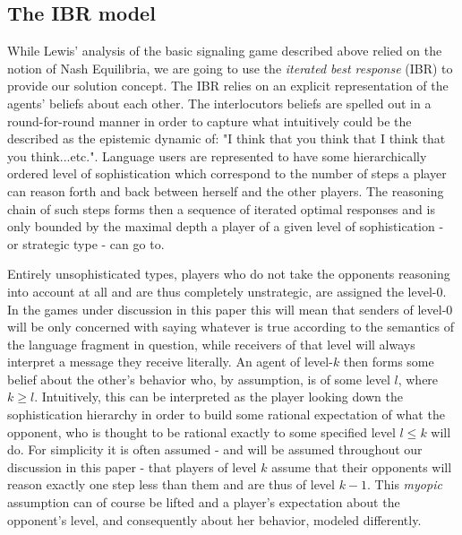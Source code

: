 \documentclass{article}
\begin{document}
\subsection{The IBR model}
While Lewis' analysis of the basic signaling game described above relied on the notion of Nash Equilibria, we are going to use the \textit{iterated best response} (IBR) to provide our solution concept. The IBR relies on an explicit representation of the agents' beliefs about each other. The interlocutors beliefs are spelled out in a round-for-round manner in order to capture what intuitively could be the described as the epistemic dynamic of: "I think that you think that I think that you think...etc.". Language users are represented to have some hierarchically ordered level of sophistication which correspond to the number of steps a player can reason forth and back between herself and the other players. The reasoning chain of such steps forms then a sequence of iterated optimal responses and is only bounded by the maximal depth a player of a given level of sophistication - or strategic type - can go to. %

Entirely unsophisticated types, players who do not take the opponents reasoning into account at all and are thus completely unstrategic, are assigned the level-0. In the games under discussion in this paper this will mean that senders of level-0 will be only concerned with saying whatever is true according to the semantics of the language fragment in question, while receivers of that level will always interpret a message they receive literally. An agent of level-$k$ then forms some belief about the other's behavior who, by assumption, is of some level $l$, where $k\geq l$. Intuitively, this can be interpreted as the player looking down the sophistication hierarchy in order to build some rational expectation of what the opponent, who is thought to be rational exactly to some specified level $l\leq k$ will do. For simplicity it is often assumed - and will be assumed throughout our discussion in this paper - that players of level $k$ assume that their opponents will reason exactly one step less than them and are thus of level $k-1$. This \textit{myopic} assumption can of course be lifted and a player's expectation about the opponent's level, and consequently about her behavior, modeled differently.
\end{document}

